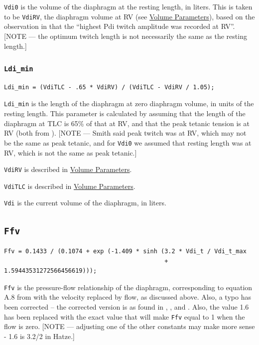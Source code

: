 \documentclass[12pt,openany,oneside]{book}
\begin{document}
\verb~Vdi0~ is the volume of the diaphragm at the resting length, in
liters.  This is taken to be \verb~VdiRV~, the diaphragm volume at RV
(see \hyperref[Volume Parameters]{Volume Parameters}), based on the
observation in \citet{Smith01051987} that the ``highest Pdi twitch
amplitude was recorded at RV''.  [NOTE --- the optimum twitch length is
not necessarily the same as the resting length.]

\subsubsection{\texttt{Ldi\_min}}
\begin{verbatim}
Ldi_min = (VdiTLC - .65 * VdiRV) / (VdiTLC - VdiRV / 1.05); 
\end{verbatim}

\verb~Ldi_min~ is the length of the diaphragm at zero diaphragm
volume, in units of the resting length.  This parameter is calculated
by assuming that the length of the diaphragm at TLC is 65\% of that at
RV, and that the peak tetanic tension is at RV (both from
\citet{Smith01051987}).  [NOTE --- Smith said peak twitch was at RV,
which may not be the same as peak tetanic, and for \verb~Vdi0~ we
assumed that resting length was at RV, which is not the same as peak
tetanic.]

\verb~VdiRV~ is described in \hyperref[Volume Parameters]{Volume
  Parameters}.

\verb~VdiTLC~ is described in \hyperref[Volume Parameters]{Volume
  Parameters}.

\verb~Vdi~ is the current volume of the diaphragm, in liters.

\subsection{\texttt{Ffv}}
\begin{verbatim}
Ffv = 0.1433 / (0.1074 + exp (-1.409 * sinh (3.2 * Vdi_t / Vdi_t_max
                                             + 1.59443531272566456619)));
\end{verbatim}
\verb~Ffv~ is the pressure-flow relationship of the diaphragm,
corresponding to equation A.8 from \citet{Ratnovsky20031771} with the
velocity replaced by flow, as discussed above.  Also, a typo has been
corrected -- the corrected version is as found in \citet{1545509},
\citet{Rosen1999415}, and \citet{Hatze1981}.  Also, the value 1.6 has
been replaced with the exact value that will make \verb~Ffv~ equal to
1 when the flow is zero. [NOTE --- adjusting one of the other constants
may make more sense - 1.6 is 3.2/2 in Hatze.]
\end{document}
